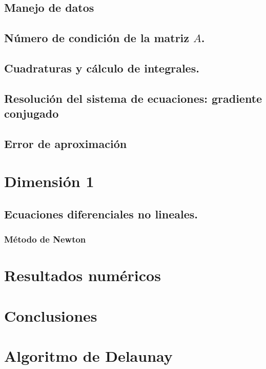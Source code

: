 \documentclass[12pt,spanish,oneside]{book}
\theoremstyle{plain}
\numberwithin{equation}{chapter}
\theoremstyle{definition}
\theoremstyle{remark}
\begin{document}
\section{Manejo de datos}


\section{Número de condición de la matriz $A$.}
\section{Cuadraturas y cálculo de integrales.}


\section{Resolución del sistema de ecuaciones: gradiente conjugado}

\section{Error de aproximación}

\chapter{Dimensión 1}

\section{Ecuaciones diferenciales no lineales.}


\subsection{Método de Newton} 


\chapter{Resultados numéricos}



\chapter{Conclusiones}

\appendix
\chapter{Algoritmo de Delaunay}\label{DelaunayApendice}
\end{document}
